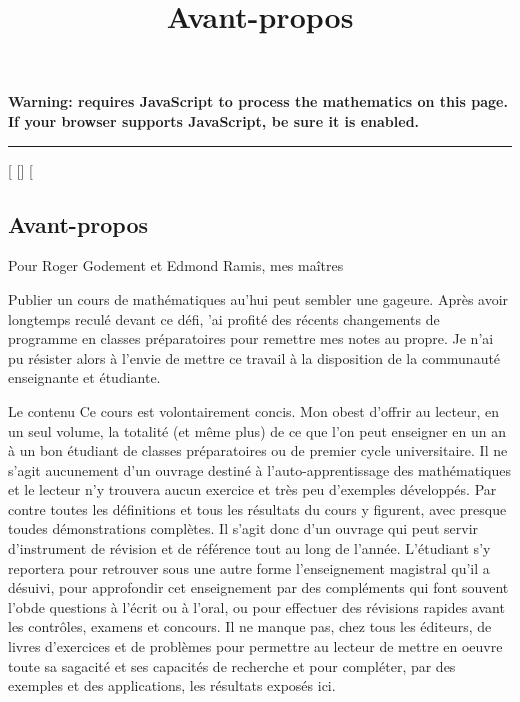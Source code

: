 \documentclass[]{article}
\title{Avant-propos}
\author{}
\date{}
\begin{document}
\maketitle

\textbf{Warning: 
requires JavaScript to process the mathematics on this page.\\ If your
browser supports JavaScript, be sure it is enabled.}

\begin{center}\rule{3in}{0.4pt}\end{center}

{[}
{[}{]}
{[}

\subsection{Avant-propos}

Pour Roger Godement et Edmond Ramis, mes maîtres

Publier un cours de mathématiques au\jmathourd'hui peut sembler une gageure.
Après avoir longtemps reculé devant ce défi, \jmath'ai profité des récents
changements de programme en classes préparatoires pour remettre mes
notes au propre. Je n'ai pu résister alors à l'envie de mettre ce
travail à la disposition de la communauté enseignante et étudiante.

Le contenu Ce cours est volontairement concis. Mon ob\jmathectif est d'offrir
au lecteur, en un seul volume, la totalité (et même plus) de ce que l'on
peut enseigner en un an à un bon étudiant de classes préparatoires ou de
premier cycle universitaire. Il ne s'agit aucunement d'un ouvrage
destiné à l'auto-apprentissage des mathématiques et le lecteur n'y
trouvera aucun exercice et très peu d'exemples développés. Par contre
toutes les définitions et tous les résultats du cours y figurent, avec
presque tou\jmathours des démonstrations complètes. Il s'agit donc d'un
ouvrage qui peut servir d'instrument de révision et de référence tout au
long de l'année. L'étudiant s'y reportera pour retrouver sous une autre
forme l'enseignement magistral qu'il a dé suivi, pour approfondir cet
enseignement par des compléments qui font souvent l'ob\jmathet de questions à
l'écrit ou à l'oral, ou pour effectuer des révisions rapides avant les
contrôles, examens et concours. Il ne manque pas, chez tous les
éditeurs, de livres d'exercices et de problèmes pour permettre au
lecteur de mettre en oeuvre toute sa sagacité et ses capacités de
recherche et pour compléter, par des exemples et des applications, les
résultats exposés ici.
\end{document}

